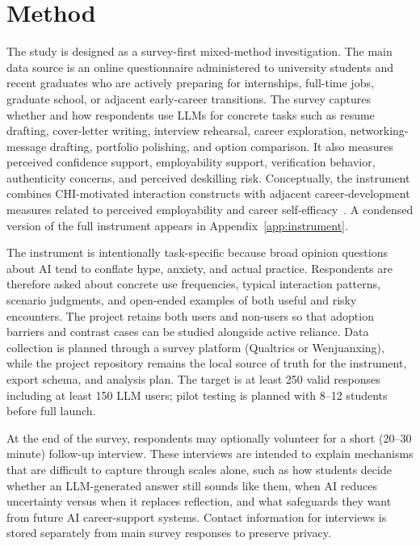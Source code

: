 \documentclass[sigconf,review,anonymous]{acmart}
\begin{document}
\section{Method}
\label{sec:method}

The study is designed as a survey-first mixed-method investigation. The main data source is an online questionnaire administered to university students and recent graduates who are actively preparing for internships, full-time jobs, graduate school, or adjacent early-career transitions. The survey captures whether and how respondents use LLMs for concrete tasks such as resume drafting, cover-letter writing, interview rehearsal, career exploration, networking-message drafting, portfolio polishing, and option comparison. It also measures perceived confidence support, employability support, verification behavior, authenticity concerns, and perceived deskilling risk. Conceptually, the instrument combines CHI-motivated interaction constructs with adjacent career-development measures related to perceived employability and career self-efficacy~\cite{bennett2022employability,jin2009careerdecision}. A condensed version of the full instrument appears in Appendix~\ref{app:instrument}.

The instrument is intentionally task-specific because broad opinion questions about AI tend to conflate hype, anxiety, and actual practice. Respondents are therefore asked about concrete use frequencies, typical interaction patterns, scenario judgments, and open-ended examples of both useful and risky encounters. The project retains both users and non-users so that adoption barriers and contrast cases can be studied alongside active reliance. Data collection is planned through a survey platform (Qualtrics or Wenjuanxing), while the project repository remains the local source of truth for the instrument, export schema, and analysis plan. The target is at least 250 valid responses including at least 150 LLM users; pilot testing is planned with 8--12 students before full launch.

At the end of the survey, respondents may optionally volunteer for a short (20--30 minute) follow-up interview. These interviews are intended to explain mechanisms that are difficult to capture through scales alone, such as how students decide whether an LLM-generated answer still sounds like them, when AI reduces uncertainty versus when it replaces reflection, and what safeguards they want from future AI career-support systems. Contact information for interviews is stored separately from main survey responses to preserve privacy.
\end{document}
